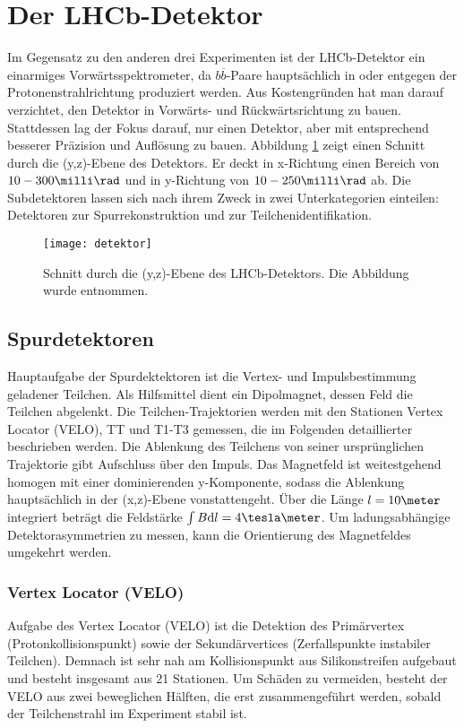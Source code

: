 \section{Der LHCb-Detektor}
Im Gegensatz zu den anderen drei Experimenten ist der LHCb-Detektor ein einarmiges Vorwärtsspektrometer, da $b\overline{b}$-Paare hauptsächlich in oder entgegen der Protonenstrahlrichtung produziert werden. Aus Kostengründen hat man darauf verzichtet, den Detektor in Vorwärts- und Rückwärtsrichtung zu bauen. Stattdessen lag der Fokus darauf, nur einen Detektor, aber mit entsprechend besserer Präzision und Auflösung zu bauen. Abbildung \ref{fig:detektor} zeigt einen Schnitt durch die (y,z)-Ebene des Detektors. Er deckt in x-Richtung einen Bereich von $10-300\milli\rad$ und in y-Richtung von $10-250\milli\rad$ ab. Die Subdetektoren lassen sich nach ihrem Zweck in zwei Unterkategorien einteilen: Detektoren zur Spurrekonstruktion und zur Teilchenidentifikation.

\begin{figure}[hptb]
\centering
\texttt{[image: detektor]}
\caption{Schnitt durch die (y,z)-Ebene des LHCb-Detektors. Die Abbildung wurde \cite{detector} entnommen.}
\label{fig:detektor}
\end{figure}


\subsection{Spurdetektoren}
Hauptaufgabe der Spurdektektoren ist die Vertex- und Impulsbestimmung geladener Teilchen. Als Hilfsmittel dient ein Dipolmagnet, dessen Feld die Teilchen abgelenkt. Die Teilchen-Trajektorien werden mit den Stationen Vertex Locator (VELO), TT und T1-T3 gemessen, die im Folgenden detaillierter beschrieben werden. Die Ablenkung des Teilchens von seiner ursprünglichen Trajektorie gibt Aufschluss über den Impuls. Das Magnetfeld ist weitestgehend homogen mit einer dominierenden y-Komponente, sodass die Ablenkung hauptsächlich in der (x,z)-Ebene vonstattengeht. Über die Länge $l=10\meter$ integriert beträgt die Feldstärke $\int B\mathrm{d}l = 4\tesla\meter$. Um ladungsabhängige Detektorasymmetrien zu messen, kann die Orientierung des Magnetfeldes umgekehrt werden. \cite{thesis_linn}

\subsubsection{Vertex Locator (VELO)}
Aufgabe des Vertex Locator (VELO) ist die Detektion des Primärvertex (Protonkollisionspunkt) sowie der Sekundärvertices (Zerfallspunkte instabiler Teilchen). Demnach ist sehr nah am Kollisionspunkt aus Silikonstreifen aufgebaut und besteht insgesamt aus 21 Stationen. Um Schäden zu vermeiden, besteht der VELO aus zwei beweglichen Hälften, die erst zusammengeführt werden, sobald der Teilchenstrahl im Experiment stabil ist.

